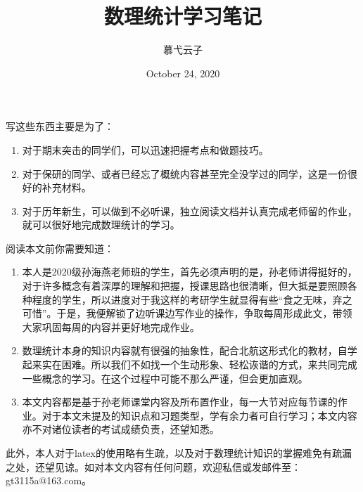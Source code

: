 \documentclass[10pt, a4paper]{article}
\title{数理统计学习笔记}
\author{慕弋云子}
\date{October 24, 2020}
\begin{document}
\maketitle

写这些东西主要是为了：
\begin{enumerate}
    \item 对于期末突击的同学们，可以迅速把握考点和做题技巧。
    \item 对于保研的同学、或者已经忘了概统内容甚至完全没学过的同学，这是一份很好的补充材料。
    \item 对于历年新生，可以做到不必听课，独立阅读文档并认真完成老师留的作业，就可以很好地完成数理统计的学习。
\end{enumerate}

阅读本文前你需要知道：
\begin{enumerate}
    \item 本人是2020级孙海燕老师班的学生，首先必须声明的是，孙老师讲得挺好的，对于许多概念有着深厚的理解和把握，授课思路也很清晰，但大抵是要照顾各种程度的学生，所以进度对于我这样的考研学生就显得有些“食之无味，弃之可惜”。于是，我便解锁了边听课边写作业的操作，争取每周形成此文，带领大家巩固每周的内容并更好地完成作业。
    \item 数理统计本身的知识内容就有很强的抽象性，配合北航这形式化的教材，自学起来实在困难。所以我们不如找一个生动形象、轻松诙谐的方式，来共同完成一些概念的学习。在这个过程中可能不那么严谨，但会更加直观。
    \item 本文内容都是基于孙老师课堂内容及所布置作业，每一大节对应每节课的作业。对于本文未提及的知识点和习题类型，学有余力者可自行学习；本文内容亦不对诸位读者的考试成绩负责，还望知悉。
\end{enumerate}\par
此外，本人对于latex的使用略有生疏，以及对于数理统计知识的掌握难免有疏漏之处，还望见谅。如对本文内容有任何问题，欢迎私信或发邮件至：gt3115a@163.com。
\end{document}
